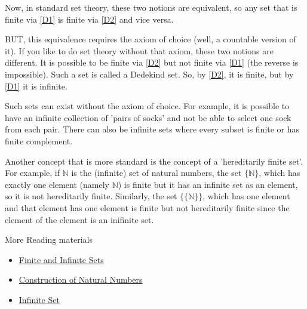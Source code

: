 Now, in standard set theory, these two notions are equivalent, so any set that is finite via 
\ref{D1} is finite via \ref{D2} and vice versa.

BUT, this equivalence requires the axiom of choice (well, a countable version of it). 
If you like to do set theory without that axiom, these two notions are different. 
It is possible to be finite via \ref{D2} but not finite via \ref{D1} (the reverse is impossible). 
Such a set is called a Dedekind set. So, by \ref{D2}, it is finite, but by \ref{D1} it is infinite.

Such sets can exist without the axiom of choice. For example, it is possible to have an infinite 
collection of 'pairs of socks' and not be able to select one sock from each pair. 
There can also be infinite sets where every subset is finite or has finite complement.

Another concept that is more standard is the concept of a 'hereditarily finite set'. 
For example, if $\mathbb N$ is the (infinite) set of natural numbers, the set $\{\mathbb N\}$, 
which has exactly one element (namely $\mathbb N$) is finite but it has an infinite set as an element, 
so it is not hereditarily finite. Similarly, the set $\{\{\mathbb N\}\}$, which has one element and that 
element has one element is finite but not hereditarily finite since the element of the element 
is an inifinite set.

\begin{remark}
More Reading materials
\begin{itemize}
    \item \href{https://math.stackexchange.com/questions/4925345/finite-infinite-set}{Finite and Infinite Sets}
    \item \href{https://math.stackexchange.com/questions/68659/set-theoretic-construction-of-the-natural-numbers}{Construction of Natural Numbers}
    \item \href{https://math.stackexchange.com/questions/3933535/what-is-the-definition-for-an-infinite-set}{Infinite Set}
\end{itemize}
\end{remark}


